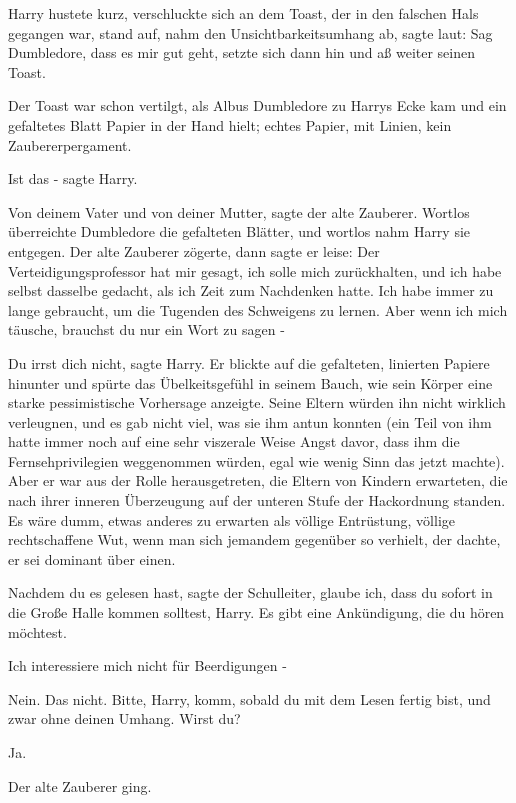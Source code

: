 Harry hustete kurz, verschluckte sich an dem Toast, der in den falschen Hals
gegangen war, stand auf, nahm den Unsichtbarkeitsumhang ab, sagte laut: \glqq
Sag Dumbledore, dass es mir gut geht\grqq{}, setzte sich dann hin und aß weiter
seinen Toast.

Der Toast war schon vertilgt, als Albus Dumbledore zu Harrys Ecke kam und ein
gefaltetes Blatt Papier in der Hand hielt; echtes Papier, mit Linien, kein
Zaubererpergament.

\glqq{}Ist das -\grqq{} sagte Harry.

\glqq{}Von deinem Vater und von deiner Mutter\grqq{}, sagte der alte Zauberer.
Wortlos überreichte Dumbledore die gefalteten Blätter, und wortlos nahm Harry
sie entgegen. Der alte Zauberer zögerte, dann sagte er leise: \glqq{}Der
Verteidigungsprofessor hat mir gesagt, ich solle mich zurückhalten, und ich habe
selbst dasselbe gedacht, als ich Zeit zum Nachdenken hatte. Ich habe immer zu
lange gebraucht, um die Tugenden des Schweigens zu lernen. Aber wenn ich mich
täusche, brauchst du nur ein Wort zu sagen -\grqq{}

\glqq{}Du irrst dich nicht\grqq{}, sagte Harry. Er blickte auf die gefalteten,
linierten Papiere hinunter und spürte das Übelkeitsgefühl in seinem Bauch, wie
sein Körper eine starke pessimistische Vorhersage anzeigte. Seine Eltern würden
ihn nicht wirklich verleugnen, und es gab nicht viel, was sie ihm antun konnten
(ein Teil von ihm hatte immer noch auf eine sehr viszerale Weise Angst davor,
dass ihm die Fernsehprivilegien weggenommen würden, egal wie wenig Sinn das
jetzt machte). Aber er war aus der Rolle herausgetreten, die Eltern von Kindern
erwarteten, die nach ihrer inneren Überzeugung auf der unteren Stufe der
Hackordnung standen. Es wäre dumm, etwas anderes zu erwarten als völlige
Entrüstung, völlige rechtschaffene Wut, wenn man sich jemandem gegenüber so
verhielt, der dachte, er sei dominant über einen.

\glqq{}Nachdem du es gelesen hast\grqq{}, sagte der Schulleiter, \glqq{}glaube
ich, dass du sofort in die Große Halle kommen solltest, Harry. Es gibt eine
Ankündigung, die du hören möchtest.\grqq{}

\glqq{}Ich interessiere mich nicht für Beerdigungen -\grqq{}

\glqq{}Nein. Das nicht. Bitte, Harry, komm, sobald du mit dem Lesen fertig bist,
und zwar ohne deinen Umhang. Wirst du?\grqq{}

\glqq{}Ja.\grqq{}

Der alte Zauberer ging.

